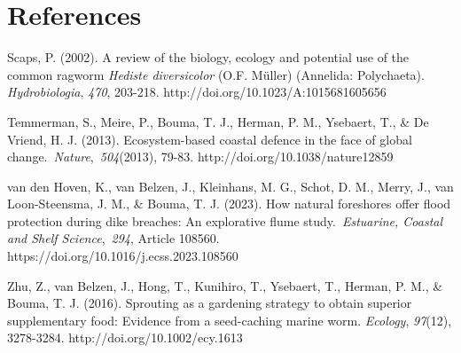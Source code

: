 \documentclass[authordate, empirical]{jote-new-article}
\begin{document}
	\section{References}



	Scaps, P. (2002). A review of the biology, ecology and potential use of the common ragworm \emph{Hediste diversicolor }(O.F. Müller) (Annelida: Polychaeta). \emph{Hydrobiologia}, \emph{470}, 203-218. http://doi.org/10.1023/A:1015681605656



	Temmerman, S., Meire, P., Bouma, T. J., Herman, P. M., Ysebaert, T., \& De Vriend, H. J. (2013). Ecosystem-based coastal defence in the face of global change. \emph{Nature}, \emph{504}(2013), 79-83. http://doi.org/10.1038/nature12859



	van den Hoven, K., van Belzen, J., Kleinhans, M. G., Schot, D. M., Merry, J., van Loon-Steensma, J. M., \& Bouma, T. J. (2023). How natural foreshores offer flood protection during dike breaches: An explorative flume study. \emph{Estuarine, Coastal and Shelf Science}, \emph{294}, Article 108560. https://doi.org/10.1016/j.ecss.2023.108560



	Zhu, Z., van Belzen, J., Hong, T., Kunihiro, T., Ysebaert, T., Herman, P. M., \& Bouma, T. J. (2016). Sprouting as a gardening strategy to obtain superior supplementary food: Evidence from a seed-caching marine worm. \emph{Ecology}, \emph{97}(12), 3278-3284. http://doi.org/10.1002/ecy.1613
\end{document}
